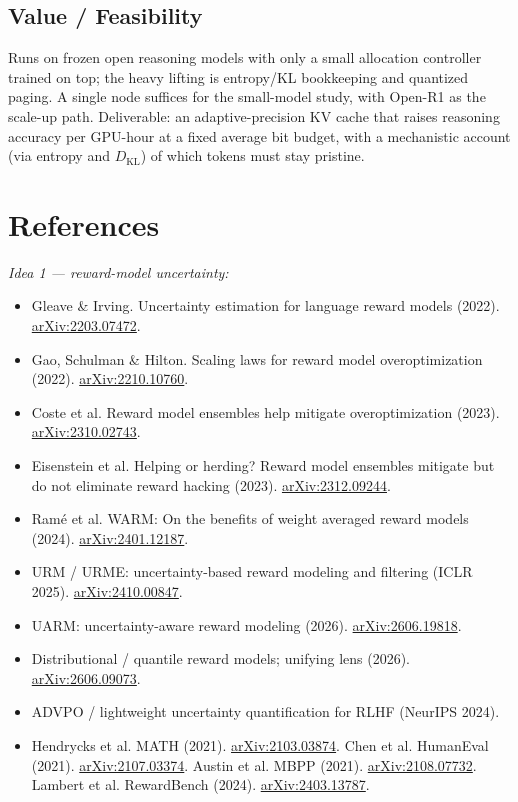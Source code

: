 \documentclass[11pt]{article}
\newcommand{\arxiv}[1]{\href{https://arxiv.org/abs/#1}{arXiv:#1}}
\begin{document}
\subsection{Value / Feasibility}
Runs on frozen open reasoning models with only a small allocation controller trained on
top; the heavy lifting is entropy/KL bookkeeping and quantized paging. A single node
suffices for the small-model study, with Open-R1 as the scale-up path. Deliverable: an
adaptive-precision KV cache that raises reasoning accuracy per GPU-hour at a fixed average
bit budget, with a mechanistic account (via entropy and $D_{\mathrm{KL}}$) of which tokens
must stay pristine.

\section*{References}
\small
\textit{Idea 1 --- reward-model uncertainty:}
\begin{itemize}[leftmargin=1.2em,itemsep=1pt]
  \item Gleave \& Irving. Uncertainty estimation for language reward models (2022). \arxiv{2203.07472}.
  \item Gao, Schulman \& Hilton. Scaling laws for reward model overoptimization (2022). \arxiv{2210.10760}.
  \item Coste et al. Reward model ensembles help mitigate overoptimization (2023). \arxiv{2310.02743}.
  \item Eisenstein et al. Helping or herding? Reward model ensembles mitigate but do not eliminate reward hacking (2023). \arxiv{2312.09244}.
  \item Ram\'e et al. WARM: On the benefits of weight averaged reward models (2024). \arxiv{2401.12187}.
  \item URM / URME: uncertainty-based reward modeling and filtering (ICLR 2025). \arxiv{2410.00847}.
  \item UARM: uncertainty-aware reward modeling (2026). \arxiv{2606.19818}.
  \item Distributional / quantile reward models; unifying lens (2026). \arxiv{2606.09073}.
  \item ADVPO / lightweight uncertainty quantification for RLHF (NeurIPS 2024).
  \item Hendrycks et al. MATH (2021). \arxiv{2103.03874}. \; Chen et al. HumanEval (2021). \arxiv{2107.03374}. \; Austin et al. MBPP (2021). \arxiv{2108.07732}. \; Lambert et al. RewardBench (2024). \arxiv{2403.13787}.
\end{itemize}
\end{document}
